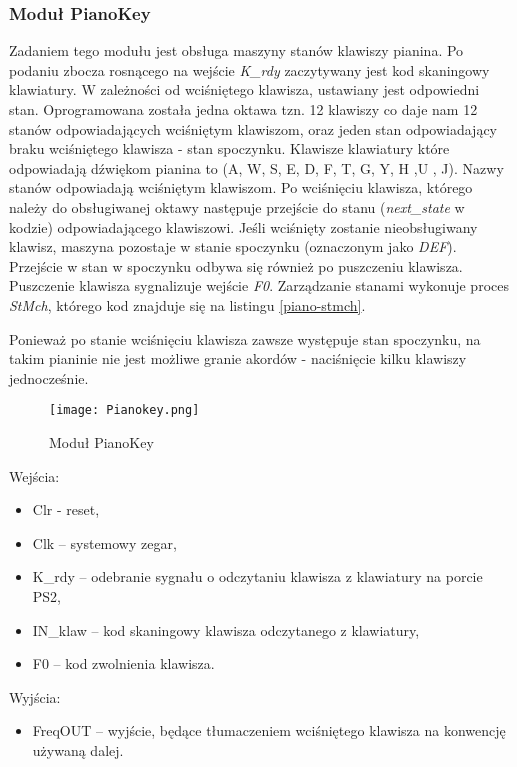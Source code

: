 \documentclass[11pt]{report}
\begin{document}
\subsubsection{Moduł PianoKey}
     Zadaniem tego modułu jest obsługa maszyny stanów klawiszy pianina. Po podaniu zbocza rosnącego na wejście \textit{K\_rdy} zaczytywany jest kod skaningowy klawiatury. W zależności od wciśniętego klawisza, ustawiany jest odpowiedni stan. Oprogramowana została jedna oktawa tzn. 12 klawiszy co daje nam 12 stanów odpowiadających wciśniętym klawiszom, oraz jeden stan odpowiadający braku wciśniętego klawisza - stan spoczynku. Klawisze klawiatury które odpowiadają dźwiękom pianina to (A, W, S, E, D, F, T, G, Y, H ,U , J). Nazwy stanów odpowiadają wciśniętym klawiszom. Po wciśnięciu klawisza, którego należy do obsługiwanej oktawy następuje przejście do stanu (\textit{next\_state} w kodzie) odpowiadającego klawiszowi. Jeśli wciśnięty zostanie nieobsługiwany klawisz, maszyna pozostaje w stanie spoczynku (oznaczonym jako \textit{DEF}). Przejście w stan w spoczynku odbywa się również po puszczeniu klawisza. Puszczenie klawisza sygnalizuje wejście \textit{F0}. Zarządzanie stanami wykonuje proces \textit{StMch}, którego kod znajduje się na listingu \ref{piano-stmch}.
   
	Ponieważ po stanie wciśnięciu klawisza zawsze występuje stan spoczynku, na takim pianinie nie jest możliwe granie akordów - naciśnięcie kilku klawiszy jednocześnie.
   
    \begin{figure}[h]
    	\centering
    	\texttt{[image: Pianokey.png]}
    	\caption{Moduł PianoKey}
	    \label{fig:piano}
    \end{figure}

	Wejścia:
	\begin{itemize}
    	\item Clr - reset,
    	\item Clk – systemowy zegar,
    	\item K\_rdy – odebranie sygnału o odczytaniu klawisza z klawiatury na porcie PS2,
    	\item IN\_klaw – kod skaningowy klawisza odczytanego z klawiatury,
    	\item F0 – kod zwolnienia klawisza.
	\end{itemize}
	Wyjścia:
	\begin{itemize}
		\item FreqOUT – wyjście, będące tłumaczeniem wciśniętego klawisza na konwencję używaną dalej.
	\end{itemize}
	
\end{document}
